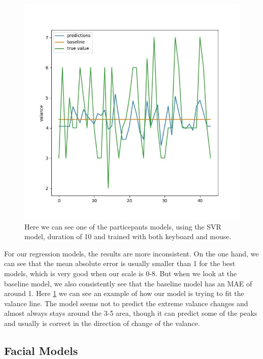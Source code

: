 \documentclass[../main.tex]{subfiles}
\begin{document}
    \begin{figure}
        \centering
        \includegraphics[width=14cm]{figures/results/reg_fit}   
        \caption{Here we can see one of the particepants models, using the SVR model, duration of 10 and trained with both keyboard and mouse.}
        \label{fig:reg_fit} 
    \end{figure}

    For our regression models, the results are more inconsistent. On the one hand, we can see that the mean absolute error is usually 
    smaller than 1 for the best models, which is very good when our scale is 0-8. But when we look at the baseline model, 
    we also consistently see that the baseline model has an MAE of around 1. Here \ref{fig:reg_fit} we can see an example of 
    how our model is trying to fit the valance line. The model seems not to predict the extreme valance changes and almost always 
    stays around the 3-5 area, though it can predict some of the peaks and usually is correct in the direction of change of the valance.

    \newpage

    \subsection{Facial Models}
\end{document}
